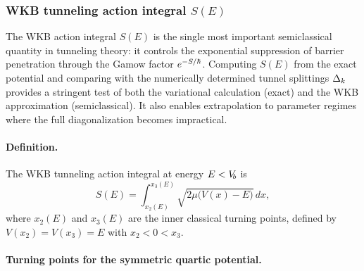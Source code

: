 \subsubsection{WKB tunneling action integral $S(E)$}\label{sec:WKB_action}

\begin{remark}
The WKB action integral $S(E)$ is the single most important semiclassical quantity in tunneling theory: it controls the exponential suppression of barrier penetration through the Gamow factor $e^{-S/\hbar}$.
Computing $S(E)$ from the exact potential and comparing with the numerically determined tunnel splittings $\Delta_k$ provides a stringent test of both the variational calculation (exact) and the WKB approximation (semiclassical).
It also enables extrapolation to parameter regimes where the full diagonalization becomes impractical.
\end{remark}

\paragraph{Definition.}

The WKB tunneling action integral at energy $E < V_{\!b}$ is
\begin{equation}\label{eq:S_WKB}
  S(E) = \int_{x_2(E)}^{x_3(E)} \sqrt{2\mu\bigl(V(x) - E\bigr)}\,dx,
\end{equation}
where $x_2(E)$ and $x_3(E)$ are the inner classical turning points, defined by $V(x_2) = V(x_3) = E$ with $x_2 < 0 < x_3$.

\paragraph{Turning points for the symmetric quartic potential.}

